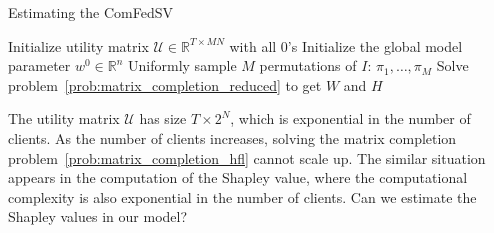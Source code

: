 \begin{algorithm}[t]
    \DontPrintSemicolon
    \caption{Estimating the ComFedSV} \label{alg:main}
    Initialize utility matrix $\mathcal{U} \in \mathbb{R}^{T\times MN}$ with all $0$'s\;
    Initialize the global model parameter $w^0 \in \mathbb{R}^n$\;
    Uniformly sample $M$ permutations of $I$: $\pi_1, \dots, \pi_M$\;
     Solve problem~\eqref{prob:matrix_completion_reduced} to get $W$ and $H$\;
\end{algorithm}

The utility matrix $\mathcal{U}$ has size $T \times 2^N$, which is exponential in the number of clients. As the number of clients increases, solving the matrix completion problem~\eqref{prob:matrix_completion_hfl} cannot scale up. The similar situation appears in the computation of the Shapley value, where the computational complexity is also exponential in the number of clients. Can we estimate the Shapley values in our model?


